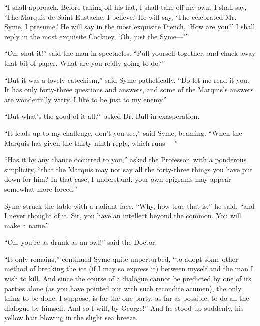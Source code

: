 \documentclass{book}
\begin{document}
“I shall approach. Before taking off his hat, I shall take off my own. I shall say, ‘The Marquis de Saint Eustache, I believe.’ He will say, ‘The celebrated Mr. Syme, I presume.’ He will say in the most exquisite French, ‘How are you?’ I shall reply in the most exquisite Cockney, ‘Oh, just the Syme—’”

“Oh, shut it!” said the man in spectacles. “Pull yourself together, and chuck away that bit of paper. What are you really going to do?”

“But it was a lovely catechism,” said Syme pathetically. “Do let me read it you. It has only forty-three questions and answers, and some of the Marquis’s answers are wonderfully witty. I like to be just to my enemy.”

“But what’s the good of it all?” asked Dr. Bull in exasperation.

“It leads up to my challenge, don’t you see,” said Syme, beaming. “When the Marquis has given the thirty-ninth reply, which runs—-”

“Has it by any chance occurred to you,” asked the Professor, with a ponderous simplicity, “that the Marquis may not say all the forty-three things you have put down for him? In that case, I understand, your own epigrams may appear somewhat more forced.”

Syme struck the table with a radiant face. “Why, how true that is,” he said, “and I never thought of it. Sir, you have an intellect beyond the common. You will make a name.”

“Oh, you’re as drunk as an owl!” said the Doctor.

“It only remains,” continued Syme quite unperturbed, “to adopt some other method of breaking the ice (if I may so express it) between myself and the man I wish to kill. And since the course of a dialogue cannot be predicted by one of its parties alone (as you have pointed out with such recondite acumen), the only thing to be done, I suppose, is for the one party, as far as possible, to do all the dialogue by himself. And so I will, by George!” And he stood up suddenly, his yellow hair blowing in the slight sea breeze.
\end{document}
